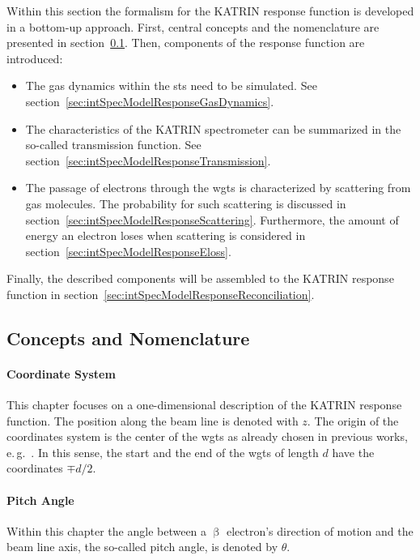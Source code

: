 Within this section the formalism for the KATRIN response function is developed in a bottom-up approach. First, central concepts and the nomenclature are presented in section~\ref{sec:intSpecModelResponseConcepts}. Then, components of the response function are introduced: 
\begin{itemize}
	\item The gas dynamics within the \gls{sts} need to be simulated. See section~\ref{sec:intSpecModelResponseGasDynamics}.
	\item The characteristics of the KATRIN spectrometer can be summarized in the so-called transmission function. See section~\ref{sec:intSpecModelResponseTransmission}.
	\item The passage of electrons through the \gls{wgts} is characterized by scattering from gas molecules. The probability for such scattering is discussed in section~\ref{sec:intSpecModelResponseScattering}. Furthermore, the amount of energy an electron loses when scattering is considered in section~\ref{sec:intSpecModelResponseEloss}.
\end{itemize}
Finally, the described components will be assembled to the KATRIN response function in section~\ref{sec:intSpecModelResponseReconciliation}.
\subsection{Concepts and Nomenclature}
\label{sec:intSpecModelResponseConcepts}

\paragraph{Coordinate System}
This chapter focuses on a one-dimensional description of the KATRIN response function. The position along the beam line is denoted with $z$. The origin of the coordinates system is the center of the \gls{wgts} as already chosen in previous works, e.\,g.~\cite{Groh2015,Kleesiek2014}. In this sense, the start and the end of the \gls{wgts} of length $d$ have the coordinates $\mp d/2$.

\paragraph{Pitch Angle}
Within this chapter the angle between a $\upbeta$ electron's direction of motion and the beam line axis, the so-called pitch angle, is denoted by $\theta$.

